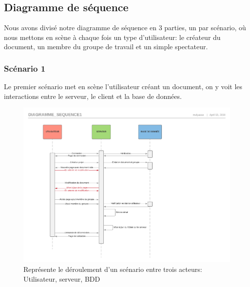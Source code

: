 \documentclass[11pt,a4paper]{article}
\begin{document}
\subsection{Diagramme de séquence}
Nous avons divisé notre diagramme de séquence en 3 parties, un par scénario, où nous mettons en scène à chaque fois un type d'utilisateur: le créateur du document, un membre du groupe de travail et un simple spectateur.
\subsubsection{Scénario 1}
Le premier scénario met en scène l'utilisateur créant un document, on y voit les interactions entre le serveur, le client et la base de données.
\newpage
\begin{figure}[!h]
\centering
\includegraphics[scale=0.5]{Image/Diagramme_sequence1.pdf}
\caption{Représente le déroulement d'un scénario entre trois acteurs: Utilisateur, serveur, BDD}
\end{figure}
\end{document}
